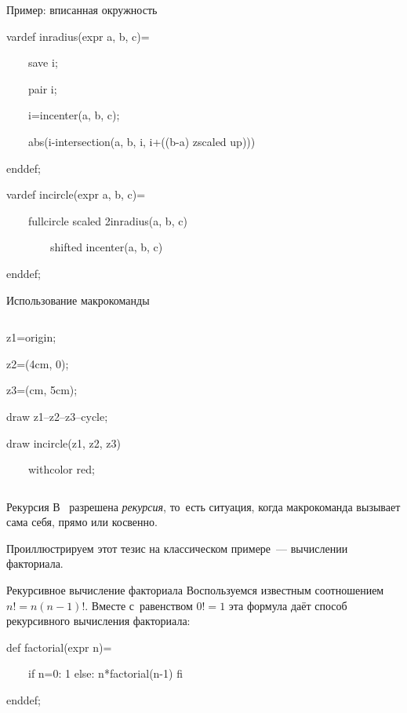\begin{frame}{Пример: вписанная окружность}
\begin{programlisting}
vardef inradius(expr a, b, c)=\par
~~~~save i;\par
~~~~pair i;\par
~~~~i=incenter(a, b, c);\par
~~~~abs(i-intersection(a, b, i, i+((b-a) zscaled up)))\par
enddef;
\end{programlisting}

\begin{programlisting}
vardef incircle(expr a, b, c)=\par
~~~~fullcircle scaled 2inradius(a, b, c)\par
~~~~~~~~shifted incenter(a, b, c)\par
enddef;
\end{programlisting}
\end{frame}

\begin{frame}{Использование макрокоманды }
\begin{columns}
\begin{programlisting}
z1=origin;\par
z2=(4cm, 0);\par
z3=(cm, 5cm);\par
draw z1--z2--z3--cycle;\par
draw incircle(z1, z2, z3)\par
~~~~withcolor red;
\end{programlisting}
\end{columns}
\end{frame}

\begin{frame}{Рекурсия}
В~ разрешена \emph{рекурсия}, то~есть ситуация, когда
макрокоманда вызывает сама себя, прямо или косвенно.

Проиллюстрируем этот тезис на классическом примере~— вычислении факториала.
\end{frame}

\begin{frame}{Рекурсивное вычисление факториала}
Воспользуемся известным соотношением $n!=n(n-1)!$. Вместе с~равенством $0!=1$
эта формула даёт способ рекурсивного вычисления факториала:

\begin{programlisting}
def factorial(expr n)=\par
~~~~if n=0: 1 else: n*factorial(n-1) fi\par
enddef;
\end{programlisting}
\end{frame}


